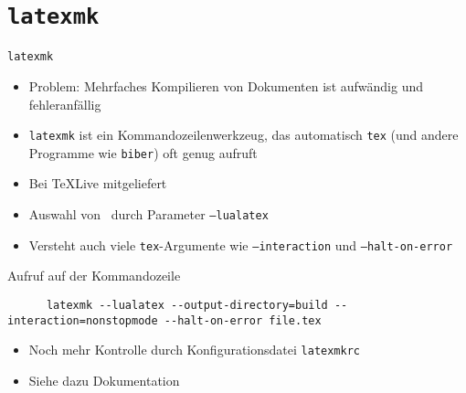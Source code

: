 \section{\texttt{latexmk}}

\begin{frame}[fragile]{
  \texttt{latexmk}
  \hfill
}
  \begin{itemize}
    \item Problem: Mehrfaches Kompilieren von Dokumenten ist aufwändig und fehleranfällig
    \item \texttt{latexmk} ist ein Kommandozeilenwerkzeug, das automatisch \texttt{tex} (und andere Programme wie \texttt{biber}) oft genug aufruft
    \item Bei TeXLive mitgeliefert
    \item Auswahl von \LuaLaTeX\ durch Parameter \texttt{--lualatex}
    \item Versteht auch viele \texttt{tex}-Argumente wie \texttt{--interaction} und \texttt{--halt-on-error}
  \end{itemize}

  \begin{block}{Aufruf auf der Kommandozeile}
    \begin{verbatim}
      latexmk --lualatex --output-directory=build --interaction=nonstopmode --halt-on-error file.tex
    \end{verbatim}
  \end{block}

  \begin{itemize}
    \item Noch mehr Kontrolle durch Konfigurationsdatei \texttt{latexmkrc}
    \item Siehe dazu Dokumentation
  \end{itemize}
\end{frame}

